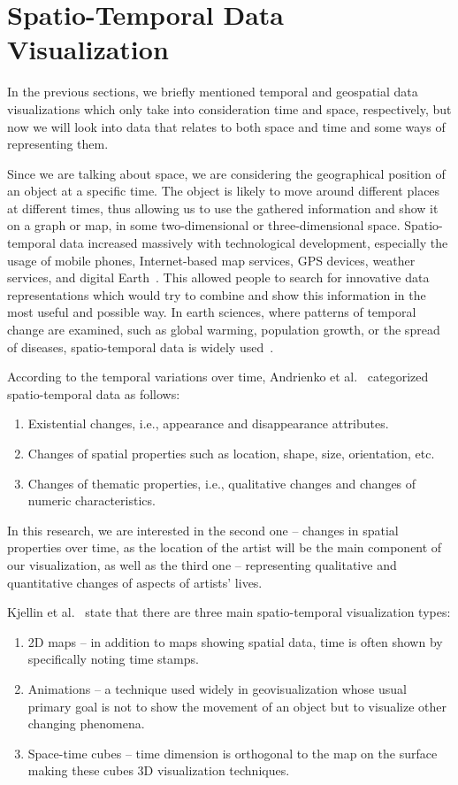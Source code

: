 \section{Spatio-Temporal Data Visualization}\label{sec:spatio-temporal-data-visualization}

In the previous sections, we briefly mentioned temporal and geospatial data visualizations which only take into
consideration time and space, respectively, but now we will look into data that relates to both space and time and some
ways of representing them.

Since we are talking about space, we are considering the geographical position of an object at a specific time.
The object is likely to move around different places at different times, thus allowing us to use the gathered
information and show it on a graph or map, in some two-dimensional or three-dimensional space. Spatio-temporal data increased massively with
technological development, especially the usage of mobile phones, Internet-based map services, GPS devices, weather
services, and digital Earth~\citep{han2022data}. This allowed people to search for innovative data representations
which would try to combine and show this information in the most useful and possible way. In earth sciences, where
patterns of temporal change are examined, such as global warming, population growth, or the spread of diseases,
spatio-temporal data is widely used~\citep{nollenburg2007geographic}.

According to the temporal variations over time, Andrienko et al.~\citep{andrienko2003exploratory} categorized
spatio-temporal data as follows:
\begin{enumerate}
    \item Existential changes, i.e., appearance and disappearance attributes.
    \item Changes of spatial properties such as location, shape, size, orientation, etc.
    \item Changes of thematic properties, i.e., qualitative changes and changes of numeric characteristics.
\end{enumerate}

In this research, we are interested in the second one -- changes in spatial properties over time, as the location of the
artist will be the main component of our visualization, as well as the third one -- representing qualitative and quantitative changes of aspects
of artists' lives.

Kjellin et al.~\citep{kjellin2008evaluating} state that there are three main spatio-temporal visualization types:
\begin{enumerate}
    \item 2D maps -- in addition to maps showing spatial data, time is often shown by specifically noting time stamps.
    \item Animations -- a technique used widely in geovisualization whose usual primary goal is not to show the movement of an object but to visualize other changing phenomena.
    \item Space-time cubes -- time dimension is orthogonal to the map on the surface making these cubes 3D visualization techniques.
\end{enumerate}

